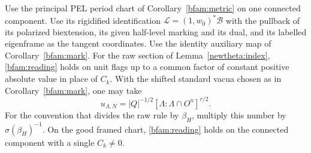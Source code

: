 \begin{proposition}
\label{bfam:unitread}
Use the principal PEL period chart of Corollary~\ref{bfam:metric}
on one connected component. Use its rigidified identification
\(\mathcal L=(1,w_0)^*\mathcal B\) with the pullback of its
polarized biextension, its given half-level marking and its dual,
and its labelled eigenframe as the tangent coordinates. Use the
identity auxiliary map of Corollary~\ref{bfam:mark}. For the raw
section of Lemma~\ref{newtheta:index}, \eqref{bfam:reading} holds
on unit flags up to a common factor of constant positive absolute
value in place of \(C_k\). With the shifted standard vacua chosen
as in Corollary~\ref{bfam:mark}, one may take
\[
        u_{\Lambda,N}=|Q|^{-1/2}
           [\Lambda:\Lambda\cap O^n]^{r/2}.
\]
For the convention that divides the raw rule by \(\beta_H\),
multiply this number by \(\sigma(\beta_H)^{-1}\).
On the good framed chart, \eqref{bfam:reading} holds on the
connected component with a single \(C_k\ne0\).
\end{proposition}
